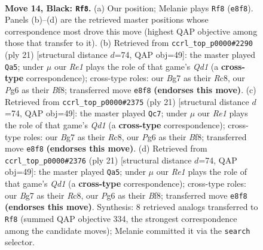 \documentclass[11pt]{article}
\begin{document}
\clearpage

\begin{figure}[p]\centering
\begin{subfigure}{0.46\textwidth}\centering
\resizebox{\linewidth}{!}{%
\newchessgame
\chessboard[
  setfen={1rbqr1k1/p2pppbp/2p3p1/8/P1P1BP1P/2N3P1/1P6/R1BQ1RK1 b - - 0 14},
  showmover=false,
  pgfstyle=straightmove, color=movearrow, markmove={e8-f8}
]}
\caption{}
\end{subfigure}\hfill
\begin{subfigure}{0.46\textwidth}\centering
\resizebox{\linewidth}{!}{%
\newchessgame
\chessboard[
  setfen={2rqkb1r/1p1bpp1p/p2p1p2/8/3QPP2/2N5/PPP3PP/2KR1B1R b k - 2 11},
  showmover=false,
  pgfstyle=straightmove, color=movearrow, markmove={d8-a5}
]}
\caption{}
\end{subfigure}
\\[4pt]
\begin{subfigure}{0.46\textwidth}\centering
\resizebox{\linewidth}{!}{%
\newchessgame
\chessboard[
  setfen={2rqkb1r/1p1bpp1p/p2p1p2/8/3QPP2/2N5/PPP3PP/2KR1B1R b k - 0 11},
  showmover=false,
  pgfstyle=straightmove, color=movearrow, markmove={d8-c7}
]}
\caption{}
\end{subfigure}\hfill
\begin{subfigure}{0.46\textwidth}\centering
\resizebox{\linewidth}{!}{%
\newchessgame
\chessboard[
  setfen={2rqkb1r/1p1bpp1p/p2p1p2/8/3QPP2/2N5/PPP3PP/2KR1B1R b k - 0 11},
  showmover=false,
  pgfstyle=straightmove, color=movearrow, markmove={d8-a5}
]}
\caption{}
\end{subfigure}
\caption{\textbf{Move 14, Black: \texttt{Rf8}.} (a) Our position; Melanie plays \texttt{Rf8} (\texttt{e8f8}). Panels (b)--(d) are the retrieved master positions whose correspondence most drove this move (highest QAP objective among those that transfer to it). (b) Retrieved from \texttt{ccrl\_top\_p0000\#2290} (ply 21) [structural distance $d$=74, QAP obj=49]: the master played \texttt{Qa5}; under $\mu$ our \emph{Re1} plays the role of that game's \emph{Qd1} (a \textbf{cross-type} correspondence); cross-type roles: our \emph{B}g7 as their \emph{R}c8, our \emph{P}g6 as their \emph{B}f8; transferred move \texttt{e8f8} \textbf{(endorses this move)}. (c) Retrieved from \texttt{ccrl\_top\_p0000\#2375} (ply 21) [structural distance $d$=74, QAP obj=49]: the master played \texttt{Qc7}; under $\mu$ our \emph{Re1} plays the role of that game's \emph{Qd1} (a \textbf{cross-type} correspondence); cross-type roles: our \emph{B}g7 as their \emph{R}c8, our \emph{P}g6 as their \emph{B}f8; transferred move \texttt{e8f8} \textbf{(endorses this move)}. (d) Retrieved from \texttt{ccrl\_top\_p0000\#2376} (ply 21) [structural distance $d$=74, QAP obj=49]: the master played \texttt{Qa5}; under $\mu$ our \emph{Re1} plays the role of that game's \emph{Qd1} (a \textbf{cross-type} correspondence); cross-type roles: our \emph{B}g7 as their \emph{R}c8, our \emph{P}g6 as their \emph{B}f8; transferred move \texttt{e8f8} \textbf{(endorses this move)}. Synthesis: 8 retrieved analogs transferred to \texttt{Rf8} (summed QAP objective 334, the strongest correspondence among the candidate moves); Melanie committed it via the \texttt{search} selector.}
\label{fig:thought-m27}
\end{figure}
\end{document}
